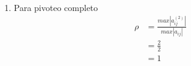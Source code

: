 \begin{enumerate}[]
\begin{enumerate}[]
\begin{enumerate}[]
             \item Para pivoteo completo
             \begin{align*}
                \rho &=  \frac{max |a_{ij}^{(2)}|}{max |a_{ij}|}\\
                &=  \frac{2}{2}\\
                &=  1\\
            \end{align*}
        \end{enumerate}
    \end{enumerate}
\end{enumerate}